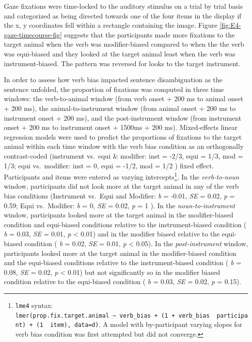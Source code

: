 \documentclass[
  man,floatsintext]{apa6}
\begin{document}
Gaze fixations were time-locked to the auditory stimulus on a trial by trial basis and categorized as being directed towards one of the four items in the display if the x, y coordinates fell within a rectangle containing the image. Figure \ref{fig:E4-gaze-timecourse-fig} suggests that the participants made more fixations to the target animal when the verb was modifier-biased compared to when the the verb was equi-biased and they looked at the target animal least when the verb was instrument-biased. The pattern was reversed for looks to the target instrument.

In order to assess how verb bias impacted sentence disambiguation as the sentence unfolded, the proportion of fixations was computed in three time windows: the verb-to-animal window (from verb onset + 200 ms to animal onset + 200 ms), the animal-to-instrument window (from animal onset + 200 ms to instrument onset + 200 ms), and the post-instrument window (from instrument onset + 200 ms to instrument onset + 1500ms + 200 ms). Mixed-effects linear regression models were used to predict the proportions of fixations to the target animal within each time window with the verb bias condition as an orthogonally contrast-coded (instrument vs.~equi \& modifier: inst = -2/3, equi = 1/3, mod = 1/3; equi vs.~modifier: inst = 0, equi = -1/2, mod = 1/2 ) fixed effect. Participants and items were entered as varying intercepts\footnote{\texttt{lme4} syntax: \texttt{lmer(prop.fix.target.animal\ \textasciitilde{}\ verb\_bias\ +\ (1\ +\ verb\_bias\ \textbar{}\ participant)\ +\ (1\ \textbar{}\ item),\ data=d)}. A model with by-participant varying slopes for verb bias condition was first attempted but did not converge.}. In the \emph{verb-to-noun} window, participants did not look more at the target animal in any of the verb bias conditions (Instrument vs.~Equi and Modifier: \emph{b} = -0.01, \emph{SE} = 0.02, \emph{p} = 0.59; Equi vs.~Modifier: \emph{b} = 0, \emph{SE} = 0.02, \emph{p} = 1 ). In the \emph{noun-to-instrument} window, participants looked more at the target animal in the modifier-biased condition and equi-biased conditions relative to the instrument-biased condition ( \emph{b} = 0.03, \emph{SE} = 0.01, \emph{p} \textless{} 0.01) and in the modifier biased relative to the equi-biased condition ( \emph{b} = 0.02, \emph{SE} = 0.01, \emph{p} \textless{} 0.05). In the \emph{post-instrument} window, participants looked more at the target animal in the modifier-biased condition and the equi-biased conditions relative to the instrument-biased condition ( \emph{b} = 0.08, \emph{SE} = 0.02, \emph{p} \textless{} 0.01) but not significantly so in the modifier biased condition relative to the equi-biased condition ( \emph{b} = 0.03, \emph{SE} = 0.02, \emph{p} = 0.15).
\end{document}
